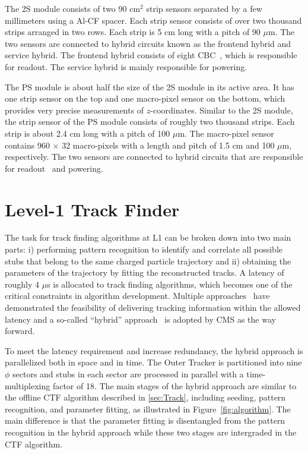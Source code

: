 The 2S module consists of two 90 cm$^{2}$ strip sensors separated by a few millimeters using a \ac{Al-CF} spacer. Each strip sensor consists of over two thousand strips arranged in two rows. Each strip is 5 cm long with a pitch of 90 $\mu$m. The two sensors are connected to hybrid circuits known as the frontend hybrid and service hybrid. The frontend hybrid consists of eight \ac{CBC}~\cite{Raymond:2012zz}, which is responsible for readout. The service hybrid is mainly responsible for powering.

The PS module is about half the size of the 2S module in its active area. It has one strip sensor on the top and one macro-pixel sensor on the bottom, which provides very precise measurements of $z$-coordinates. Similar to the 2S module, the strip sensor of the PS module consists of roughly two thousand strips. Each strip is about 2.4 cm long with a pitch of 100 $\mu$m. The macro-pixel sensor contains 960 $\times$ 32 macro-pixels with a length and pitch of 1.5 cm and 100 $\mu$m, respectively. The two sensors are connected to hybrid circuits that are responsible for readout~\cite{Ceresa:2016mqm} and powering.

\section{Level-1 Track Finder}
\label{sec:Algo}

The task for track finding algorithms at \ac{L1} can be broken down into two main parts: i) performing pattern recognition to identify and correlate all possible stubs that belong to the same charged particle trajectory and ii) obtaining the parameters of the trajectory by fitting the reconstructed tracks. A latency of roughly 4 $\mu$s is allocated to track finding algorithms, which becomes one of the critical constraints in algorithm development. Multiple approaches~\cite{CMS:2017lum} have demonstrated the feasibility of delivering tracking information within the allowed latency and a so-called ``hybrid'' approach~\cite{Zabi:2020gjd} is adopted by \ac{CMS} as the way forward.

To meet the latency requirement and increase redundancy, the hybrid approach is parallelized both in space and in time. The Outer Tracker is partitioned into nine $\phi$ sectors and stubs in each sector are processed in parallel with a time-multiplexing factor of 18. The main stages of the hybrid approach are similar to the offline \ac{CTF} algorithm described in \autoref{sec:Track}, including seeding, pattern recognition, and parameter fitting, as illustrated in Figure~\ref{fig:algorithm}. The main difference is that the parameter fitting is disentangled from the pattern recognition in the hybrid approach while these two stages are intergraded in the \ac{CTF} algorithm.

